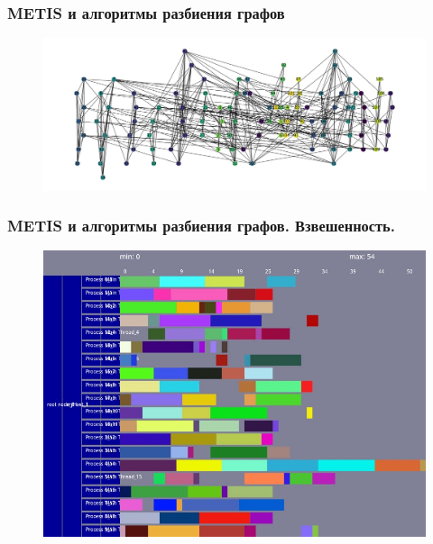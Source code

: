 \begin{frame}
    \frametitle{METIS и алгоритмы разбиения графов}
    \begin{figure}
        \includegraphics[width=\linewidth]{imgs/graph_part.jpg}
    \end{figure}
\end{frame}

\begin{frame}
    \frametitle{METIS и алгоритмы разбиения графов. Взвешенность.}
    \begin{figure}
        \includegraphics[height=0.8\textheight]{imgs/schedule_no_balanced.jpg}
    \end{figure}
\end{frame}

